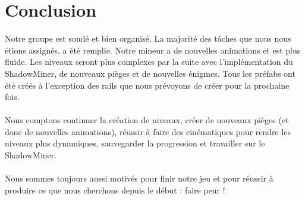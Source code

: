 \documentclass[titlepage, 13px, a4paper]{report}
\begin{document}
\newpage
{}
\part{Conclusion}
Notre groupe est soudé et bien organisé. La majorité des tâches que nous nous étions assignés, a été remplie. 
Notre mineur a de nouvelles animations et est plus fluide. Les niveaux seront plus complexes par la suite avec l’implémentation du ShadowMiner, 
de nouveaux pièges et de nouvelles énigmes. Tous les préfabs ont été créés à l’exception des rails que nous prévoyons de créer pour la prochaine fois.  \\ \\

Nous comptons continuer la création de niveaux, créer de nouveaux pièges (et donc de nouvelles animations), réussir à faire des cinématiques 
pour rendre les niveaux plus dynamiques, sauvegarder la progression et travailler sur le ShadowMiner. \\ \\

Nous sommes toujours aussi motivés pour finir notre jeu et pour réussir à produire ce que nous cherchons depuis le début : faire peur ! \\ 
\end{document}
